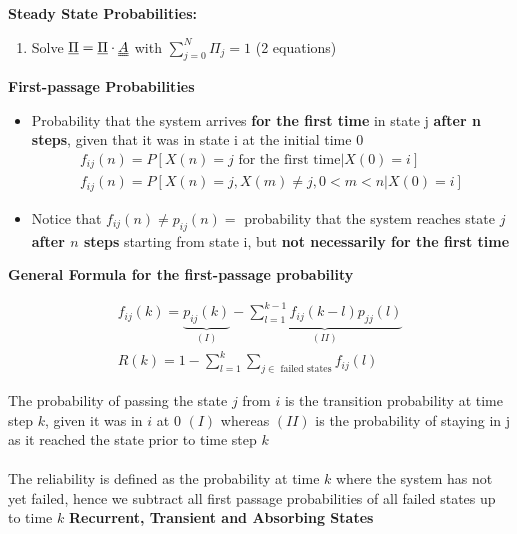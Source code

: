 \documentclass[8pt, landscape, fleqn]{scrartcl}
\begin{document}
\begin{multicols*}{3}
\textbf{Steady State Probabilities:}

\begin{enumerate}
    \item Solve $\underline{\Pi} = \underline{\Pi} \cdot \uuline{A}$ with $\sum_{j=0}^{N} \Pi_j = 1$ (2 equations)
\end{enumerate}

\textbf{First-passage Probabilities}

\begin{itemize}
    \item Probability that the system arrives \textbf{for the first time} in state j \textbf{after n steps}, given that it was in state i at the initial time 0 
    \begin{align*}
        f_{ij}(n) = P\left[X(n) = j \text{ for the first time} | X(0) = i\right] \\
            f_{ij}(n) = P\left[X(n) = j, X(m) \neq j, 0 < m < n | X(0) = i \right] \end{align*}
    \item Notice that $f_{ij}(n) \neq p_{ij}(n) = $ probability that the system reaches state $j$ \textbf{after $n$ steps} starting from state i, but \textbf{not necessarily for the first time}
\end{itemize}

\textbf{General Formula for the first-passage probability}

\begin{align}
    f_{ij}(k) = \underbrace{p_{ij}(k)}_{(I)}-\underbrace{\sum_{l=1}^{k-1} f_{ij}(k-l)p_{jj}(l)}_{(II)} \\ R(k) = 1- \sum_{l=1}^k \sum_{j \in \text{ failed states}} f_{ij}(l)
\end{align}

The probability of passing the state $j$ from $i$ is the transition probability at time step $k$, given it was in $i$ at $0$ $(I)$ whereas $(II)$ is the probability of staying in j as it reached the state prior to time step $k$ \\ \\ The reliability is defined as the probability at time $k$ where the system has not yet failed, hence we subtract all first passage probabilities of all failed states up to time $k$ \newline \newline \textbf{Recurrent, Transient and Absorbing States}



\end{multicols*}
\end{document}
